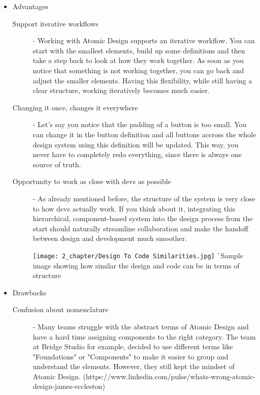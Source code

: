 \begin{itemize}
	\item Advantages
	      \begin{description}
		      \item[Support iterative workflows] - Working with Atomic Design supports an iterative
		            workflow. You can start with the smallest elements, build up some definitions and then
		            take a step back to look at how they work together. As soon as you notice that
		            something is not working together, you can go back and adjust the smaller
		            elements. Having this flexibility, while still having a clear structure, working
		            iteratively becomes much easier. 
		      \item[Changing it once, changes it everywhere] - Let's say you notice that the padding
		            of a button is too small. You can change it in the button definition and all buttons
		            accross the whole design system using this definition will be updated. This way,
		            you never have to completely redo everything, since there is always one source
		            of truth.
		      \item[Opportunity to work as close with devs as possible] - As already mentioned
		            before, the structure of the system is very close to how devs actually work.
		            If you think about it, integrating this hierarchical, component-based system
		            into the design process from the start should naturally streamline collaboration
		            and make the handoff between design and development much smoother.

		            \texttt{[image: 2\_chapter/Design To Code Similarities.jpg]}
					^^ Sample image showing how similar the design and code can be in terms of structure
	      \end{description}
	\item Drawbacks
	      \begin{description}
		      \item[Confusion about nomenclature] - Many teams struggle with the abstract terms of
		            Atomic Design and have a hard time assigning components to the right category. The
		            team at Bridge Studio for example, decided to use different terms like "Foundations"
		            or "Components" to make it easier to group and understand the elements. However, they
		            still kept the mindset of Atomic Design.
		            (https://www.linkedin.com/pulse/whats-wrong-atomic-design-james-eccleston)


\end{description}
\end{itemize}
